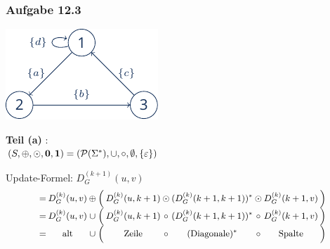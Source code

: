 \documentclass{beamer}
\begin{document}
\begin{frame} \frametitle{Aufgabe 12.3}
	\begin{minipage}{\dimexpr0.5\linewidth-\fboxrule-\fboxsep}
		\includegraphics[width=\linewidth]{./tut12_task3-graph.pdf}
	\end{minipage} 
	\pause
	\begin{minipage}{\dimexpr0.5\linewidth-\fboxrule-\fboxsep}
		\centering
		\textbf{Teil (a)} : \\
		$(S, \oplus, \odot, \mathbf{0}, \mathbf{1}) = (\mathcal{P}(\Sigma^\ast), \cup, \circ, \emptyset, \left\{ \varepsilon \right\})$
	\end{minipage}

	\hspace{1em} \pause
	
	Update-Formel: $D_G^{(k+1)}(u,v)$
	\begin{equation*}
	\small
	\setlength{\arraycolsep}{1pt}
		\begin{array}{rccrcccccr}
			=& D_G^{(k)}(u,v) &\oplus& \Big( & D_G^{(k)}(u,k+1) &\odot& (D_G^{(k)}(k+1,k+1))^\ast &\odot& D_G^{(k)}(k+1,v) & \Big) \\
			=& D_G^{(k)}(u,v) &\cup& \Big( & D_G^{(k)}(u,k+1) &\circ& (D_G^{(k)}(k+1,k+1))^\ast &\circ& D_G^{(k)}(k+1,v) & \Big) \\
			=& \text{alt} &\cup& \Big(& \text{Zeile} &\circ& (\text{Diagonale})^\ast &\circ& \text{Spalte} & \Big)
		\end{array}
	\end{equation*}
\end{frame}
\end{document}
